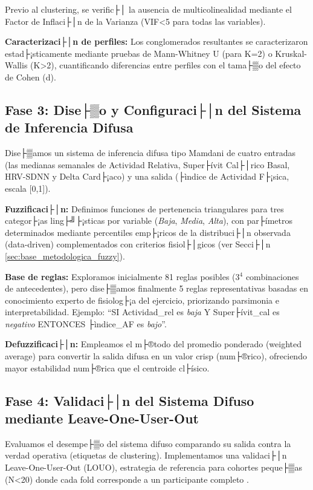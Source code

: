 Previo al clustering, se verific├│ la ausencia de multicolinealidad mediante el Factor de Inflaci├│n de la Varianza (VIF<5 para todas las variables).

\textbf{Caracterizaci├│n de perfiles:} Los conglomerados resultantes se caracterizaron estad├¡sticamente mediante pruebas de Mann-Whitney U (para K=2) o Kruskal-Wallis (K>2), cuantificando diferencias entre perfiles con el tama├▒o del efecto de Cohen (d).

\subsection{Fase 3: Dise├▒o y Configuraci├│n del Sistema de Inferencia Difusa}
\label{subsec:fase3_diseno_fuzzy}

Dise├▒amos un sistema de inferencia difusa tipo Mamdani de cuatro entradas (las medianas semanales de Actividad Relativa, Super├ívit Cal├│rico Basal, HRV-SDNN y Delta Card├¡aco) y una salida (├ìndice de Actividad F├¡sica, escala [0,1]).

\textbf{Fuzzificaci├│n:} Definimos funciones de pertenencia triangulares para tres categor├¡as ling├╝├¡sticas por variable (\textit{Baja}, \textit{Media}, \textit{Alta}), con par├ímetros determinados mediante percentiles emp├¡ricos de la distribuci├│n observada (data-driven) complementados con criterios fisiol├│gicos (ver Secci├│n \ref{sec:base_metodologica_fuzzy}).

\textbf{Base de reglas:} Exploramos inicialmente 81 reglas posibles (3$^4$ combinaciones de antecedentes), pero dise├▒amos finalmente 5 reglas representativas basadas en conocimiento experto de fisiolog├¡a del ejercicio, priorizando parsimonia e interpretabilidad. Ejemplo: ``SI Actividad\_rel es \textit{baja} Y Super├ívit\_cal es \textit{negativo} ENTONCES ├ìndice\_AF es \textit{bajo}''.

\textbf{Defuzzificaci├│n:} Empleamos el m├®todo del promedio ponderado (weighted average) para convertir la salida difusa en un valor crisp (num├®rico), ofreciendo mayor estabilidad num├®rica que el centroide cl├ísico.

\subsection{Fase 4: Validaci├│n del Sistema Difuso mediante Leave-One-User-Out}
\label{subsec:fase4_validacion_louo}

Evaluamos el desempe├▒o del sistema difuso comparando su salida contra la verdad operativa (etiquetas de clustering). Implementamos una validaci├│n Leave-One-User-Out (LOUO), estrategia de referencia para cohortes peque├▒as (N<20) donde cada fold corresponde a un participante completo \cite{Alinia2020,Crozat2025}.


